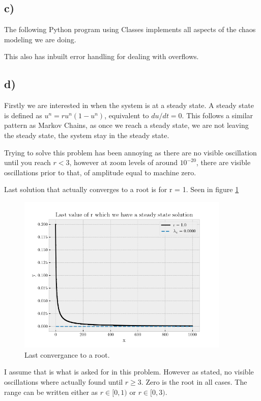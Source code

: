 \documentclass[10pt, a4paper]{amsart}
\begin{document}
\subsection{c)}
The following Python program using Classes implements all aspects of the chaos modeling we are doing. 

This also has inbuilt error handling for dealing with overflows. 

\subsection{d)}
Firstly we are interested in when the system is at a steady state. A steady state is defined as $u^n = ru^n(1-u^n)$, equivalent to $du/dt = 0$. This follows a similar pattern as Markov Chains, as once we reach a steady state, we are not leaving the steady state, the system stay in the steady state. 

Trying to solve this problem has been annoying as there are no visible oscillation until you reach $r < 3$, however at zoom levels of around $10^{-20}$, there are visible oscillations prior to that, of amplitude equal to machine zero. 

Last solution that actually converges to a root is for r = 1. Seen in figure \ref{fig:1}
\begin{figure}
	\centering
	\includegraphics[width=0.9\textwidth]{../code/d.png}

	\caption{Last convergance to a root.}
		\label{fig:1}
\end{figure}
I assume that is what is asked for in this problem. However as stated, no visible oscillations where actually found until $r\geq3$.
Zero is the root in all cases. The range can be written either as $r\in[0,1)$ or $r\in[0,3)$. 
\end{document}
